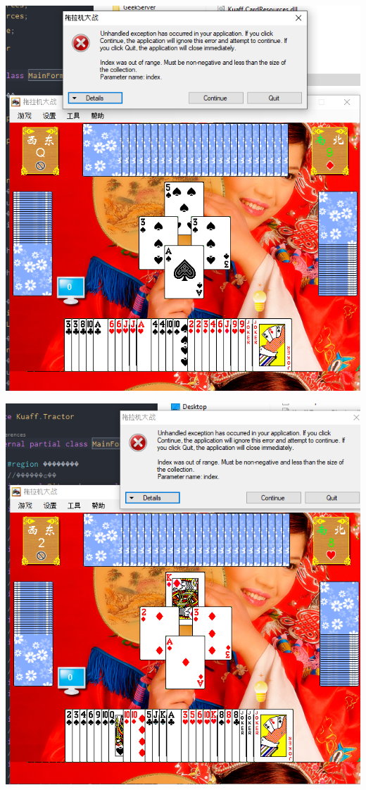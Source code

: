 \documentclass[9pt, b5paper]{article}
\begin{document}
\includegraphics[width=.9\linewidth]{./pic/readme_20230510_042818.png}

\includegraphics[width=.9\linewidth]{./pic/readme_20230510_043722.png}
\end{document}
